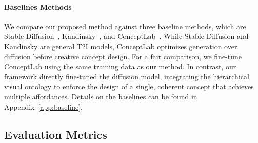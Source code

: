 
\paragraph{Baselines Methods}
We compare our proposed method against three baseline methods, which are Stable Diffusion~\cite{esser2024scalingrectifiedflowtransformers}, Kandinsky~\cite{arkhipkin2023kandinsky}, and ConceptLab~\cite{richardson2024conceptlab}. While Stable Diffusion and Kandinsky are general T2I models, ConceptLab optimizes generation over diffusion before creative concept design. For a fair comparison, we fine-tune ConceptLab using the same training data as our method. In contrast, our framework directly fine-tuned the diffusion model, integrating the hierarchical visual ontology to enforce the design of a single, coherent concept that achieves multiple affordances. Details on the baselines can be found in Appendix~\ref{app:baseline}.


\subsection{Evaluation Metrics}
\label{sec:eval}
